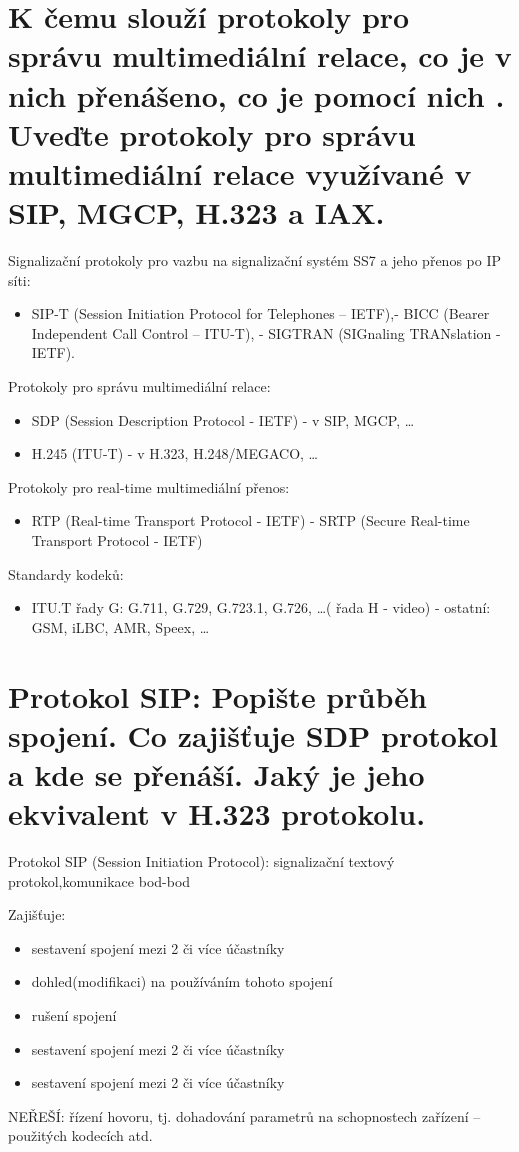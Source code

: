 \section{K čemu slouží protokoly pro správu multimediální relace, co je v nich přenášeno, co je pomocí nich . Uveďte protokoly pro správu multimediální relace využívané v SIP, MGCP, H.323 a IAX.}

Signalizační protokoly pro vazbu na signalizační systém SS7 a jeho přenos po IP síti:
\begin{itemize}[noitemsep]
    \item SIP-T (Session Initiation Protocol for Telephones -- IETF),- BICC (Bearer Independent Call Control -- ITU-T), - SIGTRAN (SIGnaling TRANslation - IETF).
\end{itemize}

Protokoly pro správu multimediální relace:
\begin{itemize}[noitemsep]
    \item SDP (Session Description Protocol - IETF) - v SIP, MGCP, \ldots
    \item H.245 (ITU-T) - v H.323, H.248/MEGACO, \ldots
\end{itemize}

Protokoly pro real-time multimediální přenos:
\begin{itemize}[noitemsep]
    \item RTP (Real-time Transport Protocol - IETF) - SRTP (Secure Real-time Transport Protocol - IETF)
\end{itemize}

Standardy kodeků:
\begin{itemize}[noitemsep]
    \item ITU.T řady G: G.711, G.729, G.723.1, G.726, \ldots ( řada H - video) - ostatní: GSM, iLBC, AMR, Speex, \ldots
\end{itemize}

\section{Protokol SIP: Popište průběh spojení. Co zajišťuje SDP protokol a kde se přenáší. Jaký je jeho ekvivalent v H.323 protokolu.}

Protokol SIP (Session Initiation Protocol): signalizační textový protokol,komunikace bod-bod

Zajišťuje:
\begin{itemize}[noitemsep]
    \item sestavení spojení mezi 2 či více účastníky
    \item dohled(modifikaci) na používáním tohoto spojení
    \item rušení spojení
    \item sestavení spojení mezi 2 či více účastníky
    \item sestavení spojení mezi 2 či více účastníky
\end{itemize}
NEŘEŠÍ: řízení hovoru, tj. dohadování parametrů na schopnostech zařízení -- použitých kodecích atd.

